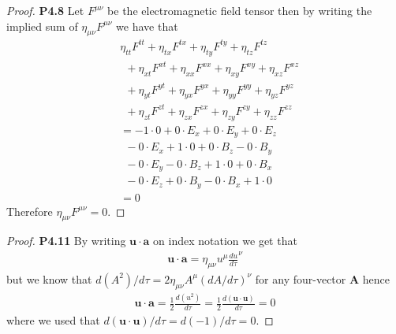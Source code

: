 \documentclass[11pt]{article}
\theoremstyle{definition}
\begin{document}
\begin{proof}{\textbf{P4.8}}
    Let $F^{\mu\nu}$ be the electromagnetic field tensor then by writing the
    implied sum of $\eta_{\mu\nu}F^{\mu\nu}$ we have that
    \begin{align*}
        &\eta_{tt}F^{tt} + \eta_{tx}F^{tx} + \eta_{ty}F^{ty} + \eta_{tz}F^{tz}\\
        &~~+ \eta_{xt}F^{xt} + \eta_{xx}F^{xx} + \eta_{xy}F^{xy} + \eta_{xz}F^{xz}\\
        &~~+ \eta_{yt}F^{yt} + \eta_{yx}F^{yx} + \eta_{yy}F^{yy} + \eta_{yz}F^{yz}\\
        &~~+ \eta_{zt}F^{zt} + \eta_{zx}F^{zx} + \eta_{zy}F^{zy} + \eta_{zz}F^{zz}\\
        &= -1 \cdot 0 + 0 \cdot E_x + 0 \cdot E_y + 0 \cdot E_z\\
        &~~- 0 \cdot E_x + 1 \cdot 0 + 0 \cdot B_z - 0 \cdot B_y\\
        &~~- 0 \cdot E_y - 0 \cdot B_z + 1 \cdot 0 + 0 \cdot B_x\\
        &~~- 0 \cdot E_z + 0 \cdot B_y - 0 \cdot B_x + 1 \cdot 0\\
        &= 0
    \end{align*}
    Therefore $\eta_{\mu\nu} F^{\mu\nu} = 0$.
\end{proof}
\begin{proof}{\textbf{P4.11}}
    By writing $\bm{u} \cdot \bm{a}$ on index notation we get that
    \begin{align*}
        \bm{u} \cdot \bm{a} = \eta_{\mu\nu} u^\mu \frac{du}{d\tau}^\nu
    \end{align*}
    but we know that $d(A^2)/d\tau = 2\eta_{\mu\nu} A^\mu (dA/d\tau)^\nu$ for
    any four-vector $\bm A$ hence 
    \begin{align*}
        \bm{u} \cdot \bm{a} = \frac{1}{2}\frac{d(u^2)}{d\tau}
        = \frac{1}{2}\frac{d(\bm u \cdot \bm u)}{d\tau} = 0 
    \end{align*}
    where we used that $d(\bm u \cdot \bm u)/d\tau = d(-1) /d\tau = 0$.
\end{proof}
\end{document}
